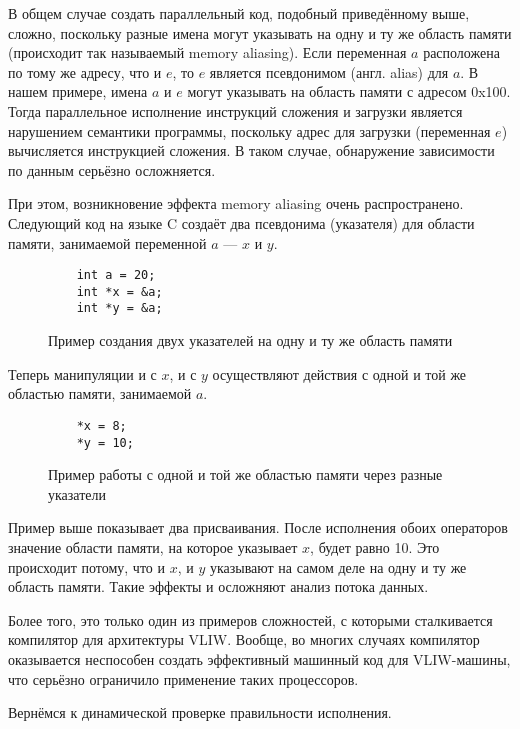 В общем случае создать параллельный код, подобный приведённому выше, сложно, поскольку разные имена могут указывать на одну и ту же область памяти (происходит так называемый memory aliasing). Если переменная $a$ расположена по тому же адресу, что и $e$, то $e$ является псевдонимом (англ. alias) для $a$. В нашем примере, имена $a$ и $e$ могут указывать на область памяти с адресом 0x100. Тогда параллельное исполнение инструкций сложения и загрузки является нарушением семантики программы, поскольку адрес для загрузки (переменная $e$) вычисляется инструкцией сложения. В таком случае, обнаружение зависимости по данным серьёзно осложняется.

При этом, возникновение эффекта memory aliasing очень распространено. Следующий код на языке C создаёт два псевдонима (указателя) для области памяти, занимаемой переменной $a$ --- $x$ и $y$.

\begin{figure}[H]
    \begin{verbatim}
    int a = 20;
    int *x = &a;
    int *y = &a;
    \end{verbatim}
    \caption{Пример создания двух указателей на одну и ту же область памяти}
    \label{fig:aliasing}
\end{figure}

Теперь манипуляции и с $x$, и с $y$ осуществляют действия с одной и той же областью памяти, занимаемой $a$.

\begin{figure}[H]
    \begin{verbatim}
    *x = 8;
    *y = 10;
    \end{verbatim}
    \label{fig:aliasing-2}
    \caption{Пример работы с одной и той же областью памяти через разные указатели}
\end{figure}

Пример выше показывает два присваивания. После исполнения обоих операторов значение области памяти, на которое указывает $x$, будет равно 10. Это происходит потому, что и $x$, и $y$ указывают на самом деле на одну и ту же область памяти. Такие эффекты и осложняют анализ потока данных.

Более того, это только один из примеров сложностей, с которыми сталкивается компилятор для архитектуры VLIW. Вообще, во многих случаях компилятор оказывается неспособен создать эффективный машинный код для VLIW-машины, что серьёзно ограничило применение таких процессоров.

Вернёмся к динамической проверке правильности исполнения.

